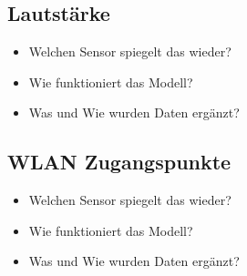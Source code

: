 \subsection{Lautstärke}
\begin{itemize}
    \item Welchen Sensor spiegelt das wieder?
    \item Wie funktioniert das Modell?
    \item Was und Wie wurden Daten ergänzt?
\end{itemize}

\subsection{WLAN Zugangspunkte}
\begin{itemize}
    \item Welchen Sensor spiegelt das wieder?
    \item Wie funktioniert das Modell?
    \item Was und Wie wurden Daten ergänzt?
\end{itemize}
